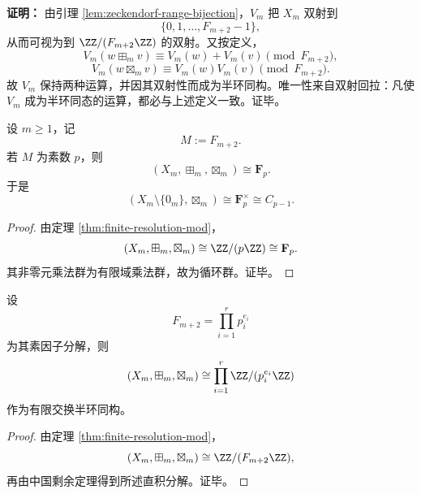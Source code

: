 \textbf{证明：}
由引理 \ref{lem:zeckendorf-range-bijection}，\(V_m\) 把 \(X_m\) 双射到
\[
\{0,1,\dots,F_{m+2}-1\},
\]
从而可视为到 \(\ZZ/(F_{m+2}\ZZ)\) 的双射。又按定义，
\[
V_m(w\boxplus_m v)\equiv V_m(w)+V_m(v)\pmod{F_{m+2}},
\]
\[
V_m(w\boxtimes_m v)\equiv V_m(w)V_m(v)\pmod{F_{m+2}}.
\]
故 \(V_m\) 保持两种运算，并因其双射性而成为半环同构。唯一性来自双射回拉：凡使 \(V_m\) 成为半环同态的运算，都必与上述定义一致。证毕。

\begin{corollary}\label{cor:field-phase-fib-prime}
设 \(m\ge 1\)，记
\[
M:=F_{m+2}.
\]
若 \(M\) 为素数 \(p\)，则
\[
(X_m,\boxplus_m,\boxtimes_m)\cong \mathbf F_p.
\]
于是
\[
(X_m\setminus\{0_m\},\boxtimes_m)\cong \mathbf F_p^\times\cong C_{p-1}.
\]
\end{corollary}
\begin{proof}
由定理 \ref{thm:finite-resolution-mod}，
\[
(X_m,\boxplus_m,\boxtimes_m)\cong \ZZ/(p\ZZ)\cong \mathbf F_p.
\]
其非零元乘法群为有限域乘法群，故为循环群。证毕。
\end{proof}

\begin{corollary}[CRT 分裂]\label{cor:crt-factorization}
设
\[
F_{m+2}=\prod_{i=1}^{r} p_i^{e_i}
\]
为其素因子分解，则
\[
(X_m,\boxplus_m,\boxtimes_m)
\cong
\prod_{i=1}^{r}\ZZ/(p_i^{e_i}\ZZ)
\]
作为有限交换半环同构。
\end{corollary}
\begin{proof}
由定理 \ref{thm:finite-resolution-mod}，
\[
(X_m,\boxplus_m,\boxtimes_m)\cong \ZZ/(F_{m+2}\ZZ),
\]
再由中国剩余定理得到所述直积分解。证毕。
\end{proof}

